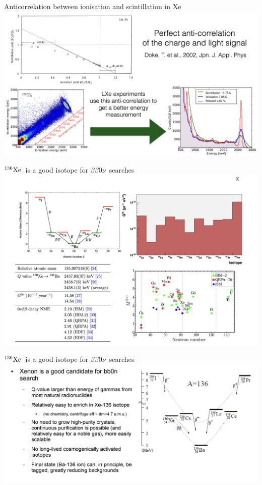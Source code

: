 \documentclass [aspectratio=169]{beamer}
\newcommand{\bbonu}{\ensuremath{\beta\beta0\nu}}
\newcommand{\XE}{\ensuremath{{}^{136}{\rm Xe}}}
\begin{document}
\begin{frame}{Anticorrelation between ionisation and scintillation in Xe}
\includegraphics[scale=0.25]{anticorr.png}
\end{frame}

\begin{frame}{\XE\ is a good isotope for \bbonu\ searches}
\includegraphics[scale=0.22]{xebb0nu.png}
\end{frame}

\begin{frame}{\XE\ is a good isotope for \bbonu\ searches}
\includegraphics[scale=0.42]{xenonbbonu2.png}
\end{frame}
\end{document}
